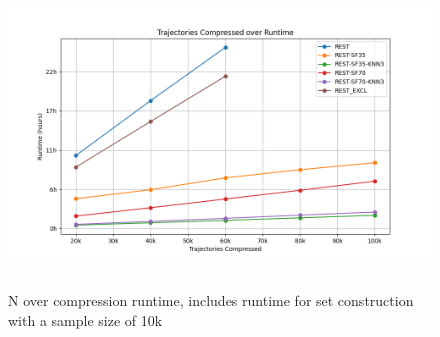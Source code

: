 
\begin{figure}[h!]
    \begin{minipage}{0.99\linewidth}
        \centering
        \includegraphics[height=8cm, keepaspectratio]{./figures/n_runtime.png}
        \caption{N over compression runtime, includes runtime for set construction with a sample size of 10k}
        \label{fig:n_runtime}
    \end{minipage}
\end{figure}